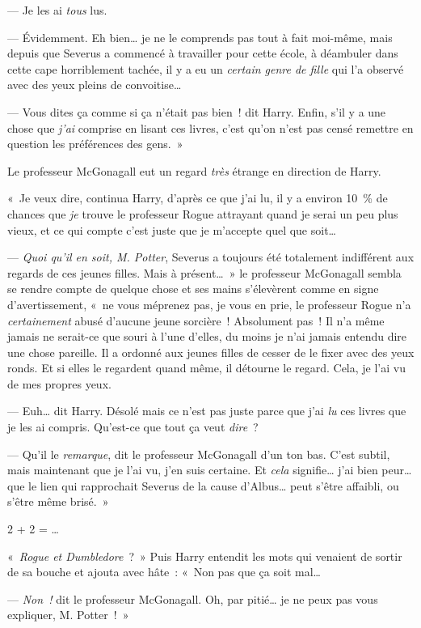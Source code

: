 --- Je les ai \emph{tous} lus.

--- Évidemment. Eh bien… je ne le comprends pas tout à fait moi-même, mais depuis que Severus a commencé à travailler pour cette école, à déambuler dans cette cape horriblement tachée, il y a eu un \emph{certain genre de fille} qui l'a observé avec des yeux pleins de convoitise…

--- Vous dites ça comme si ça n'était pas bien~! dit Harry. Enfin, s'il y a une chose que \emph{j'ai} comprise en lisant ces livres, c'est qu'on n'est pas censé remettre en question les préférences des gens.~»

Le professeur McGonagall eut un regard \emph{très} étrange en direction de Harry.

«~Je veux dire, continua Harry, d'après ce que j'ai lu, il y a environ 10~\% de chances que \emph{je} trouve le professeur Rogue attrayant quand je serai un peu plus vieux, et ce qui compte c'est juste que je m'accepte quel que soit…

--- \emph{Quoi qu'il en soit, M. Potter}, Severus a toujours été totalement indifférent aux regards de ces jeunes filles. Mais à présent…~» le professeur McGonagall sembla se rendre compte de quelque chose et ses mains s'élevèrent comme en signe d'avertissement, «~ne vous méprenez pas, je vous en prie, le professeur Rogue n'a \emph{certainement} abusé d'aucune jeune sorcière~! Absolument pas~! Il n'a même jamais ne serait-ce que souri à l'une d'elles, du moins je n'ai jamais entendu dire une chose pareille. Il a ordonné aux jeunes filles de cesser de le fixer avec des yeux ronds. Et si elles le regardent quand même, il détourne le regard. Cela, je l'ai vu de mes propres yeux.

--- Euh… dit Harry. Désolé mais ce n'est pas juste parce que j'ai \emph{lu} ces livres que je les ai compris. Qu'est-ce que tout ça veut \emph{dire}~?

--- Qu'il le \emph{remarque}, dit le professeur McGonagall d'un ton bas. C'est subtil, mais maintenant que je l'ai vu, j'en suis certaine. Et \emph{cela} signifie… j'ai bien peur… que le lien qui rapprochait Severus de la cause d'Albus… peut s'être affaibli, ou s'être même brisé.~»

2 + 2 = …

«~\emph{Rogue et Dumbledore}~?~» Puis Harry entendit les mots qui venaient de sortir de sa bouche et ajouta avec hâte~: «~Non pas que ça soit mal…

--- \emph{Non~!} dit le professeur McGonagall. Oh, par pitié… je ne peux pas vous expliquer, M. Potter~!~»

